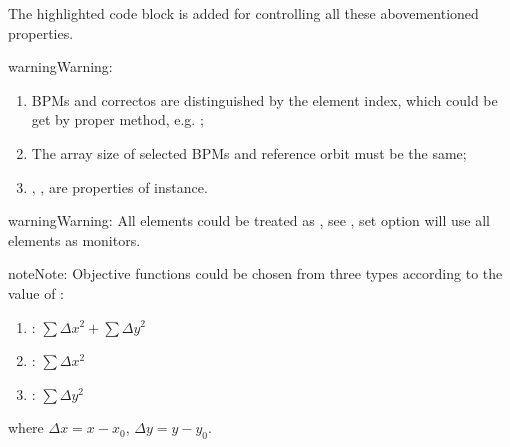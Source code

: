 \documentclass[letterpaper,10pt,english]{sphinxmanual}
\begin{document}
\begin{sphinxVerbatim}[commandchars=\\\{\},formatcom=\scriptsize]


\end{sphinxVerbatim}

The highlighted code block is added for controlling all these
abovementioned properties.

\begin{sphinxadmonition}{warning}{Warning:}\begin{enumerate}
\item {} 
BPMs and correctos are distinguished by the element index, which
could be get by proper method, e.g. ;

\item {} 
The array size of selected BPMs and reference orbit must be the same;

\item {} 
, ,  are properties of  instance.

\end{enumerate}
\end{sphinxadmonition}

\begin{sphinxadmonition}{warning}{Warning:}
All elements could be treated as , see , set 
option will use all elements as monitors.
\end{sphinxadmonition}

\begin{sphinxadmonition}{note}{Note:}
Objective functions could be chosen from three types according to the value
of :
\begin{enumerate}
\item {} 
: \(\sum \Delta x^2 + \sum \Delta y^2\)

\item {} 
: \(\sum \Delta x^2\)

\item {} 
: \(\sum \Delta y^2\)

\end{enumerate}

where \(\Delta x = x - x_0\), \(\Delta y = y - y_0\).
\end{sphinxadmonition}
\end{document}
